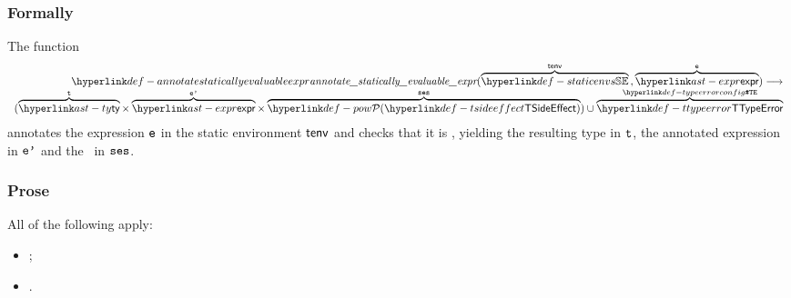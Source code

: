 \subsubsection{Formally}
\begin{mathpar}
\end{mathpar}

\begin{mathpar}
\end{mathpar}

\begin{mathpar}
\end{mathpar}

\begin{mathpar}
\end{mathpar}

\hypertarget{def-annotatestaticallyevaluableexpr}{}
The function
\[
\begin{array}{r}
  \annotatestaticallyevaluableexpr(\overname{\staticenvs}{\tenv} \aslsep \overname{\expr}{\ve}) \aslto \\
  (\overname{\ty}{\vt}\times\overname{\expr}{\vep}\times\overname{\TSideEffectSet}{\vses}) \cup \overname{\TTypeError}{\TypeErrorConfig}
\end{array}
\]
annotates the expression $\ve$ in the static environment $\tenv$ and checks that it is \staticallyevaluable,
yielding the resulting type in $\vt$, the annotated expression in $\vep$ and the \sideeffectsetterm\ in $\vses$.
\ProseOtherwiseTypeError

\subsubsection{Prose}
All of the following apply:
\begin{itemize}
  \item \Proseannotateexpr{$\tenv$}{$\ve$}{$(\vt, \vep, \vses)$};
  \item \Prosecheckstaticallyevaluable{$\vses$}.
\end{itemize}


